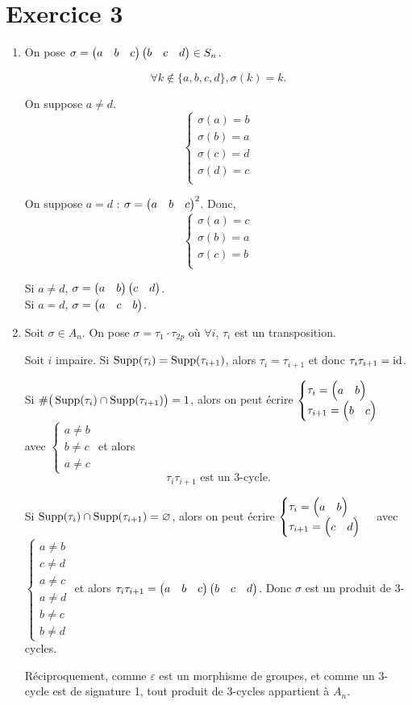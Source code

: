\part{Exercice 3}

\begin{enumerate}
	\item On pose $\sigma = \begin{pmatrix} a&b&c \end{pmatrix}\begin{pmatrix} b&c&d \end{pmatrix} \in S_n$.

		\[
			\forall k \not\in  \{a, b, c, d\}, \sigma(k) = k.
		\]

		On suppose $a \neq d$. \[
			\begin{cases}
				\sigma(a) = b\\
				\sigma(b) = a\\
				\sigma(c) = d\\
				\sigma(d) = c\\
			\end{cases}
		\] 

		On suppose $a = d$ : $\sigma = \begin{pmatrix} a&b&c \end{pmatrix}^2$. Donc, \[
			\begin{cases}
				\sigma(a) = c\\
				\sigma(b) = a\\
				\sigma(c) = b\\
			\end{cases}
		\]


		Si $a \neq d$, $\sigma = \begin{pmatrix} a&b \end{pmatrix}\begin{pmatrix} c&d \end{pmatrix}$.\\
		Si $a = d$, $\sigma = \begin{pmatrix} a&c&b \end{pmatrix}$.
	\item Soit $\sigma \in A_n$. On pose $\sigma = \tau_1 \cdot \tau_{2p}$ où $\forall i$, $\tau_i$ est un transposition.

		Soit $i$ impaire. Si $\operatorname{Supp}(\tau_i) = \operatorname{Supp}(\tau_{i+1})$, alors $\tau_i = \tau_{i+1}$ et donc $\tau_i \tau_{i+1} = \operatorname{id}$.

		Si $\#\big(\operatorname{Supp}(\tau_i) \cap \operatorname{Supp}(\tau_{i+1})\big) = 1$, alors on peut écrire $\begin{cases}
			\tau_i = \begin{pmatrix} a&b \end{pmatrix}\\
			\tau_{i+1} = \begin{pmatrix} b&c \end{pmatrix}
		\end{cases}$ avec $\begin{cases}
			a \neq b\\
			b\neq c\\
			a\neq c
		\end{cases}$ et alors \[
			\tau_i \tau_{i+1} \text{ est un 3-cycle}.
		\]

		Si $\operatorname{Supp}(\tau_i) \cap \operatorname{Supp}(\tau_{i+1}) = \varnothing$, alors on peut écrire $\begin{cases}
			\tau_i = \begin{pmatrix} a&b \end{pmatrix}\\
			\tau_{i+1} = \begin{pmatrix} c&d \end{pmatrix}
		\end{cases}$ avec {\small$\begin{cases}
			a\neq b\\
			c\neq d\\
			a\neq c\\
			a\neq d\\
			b\neq c\\
			b\neq d
		\end{cases}$} et alors $\tau_{i}\tau_{i+1} = \begin{pmatrix} a&b&c \end{pmatrix}\begin{pmatrix} b&c&d \end{pmatrix}$.
		Donc $\sigma$ est un produit de $3$-cycles.

		Réciproquement, comme $\varepsilon$ est un morphisme de groupes, et comme un $3$-cycle est de signature 1, tout produit de 3-cycles appartient à $A_n$.
\end{enumerate}
